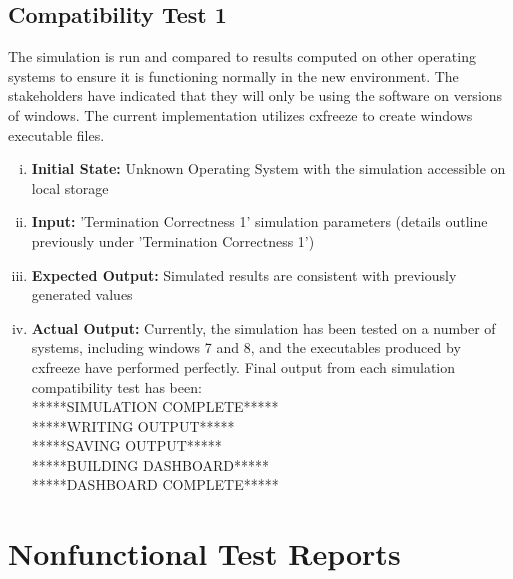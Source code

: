\documentclass[paper=letter, fontsize=10pt]{scrartcl}
\numberwithin{equation}{section}		%
\numberwithin{figure}{section}			%
\numberwithin{table}{section}				%
\begin{document}
\begin{enumerate}[(i)]
\subsection{Compatibility Test 1} %
The simulation is run and compared to results computed on other operating systems to ensure it is functioning normally in the new environment. The stakeholders have indicated that they will only be using the software on versions of windows. The current implementation utilizes cxfreeze to create windows executable files. 
\begin{enumerate}[(i)]
	\item \textbf{Initial State:} Unknown Operating System with the simulation accessible on local storage
	\item \textbf{Input:} 'Termination Correctness 1' simulation parameters (details outline previously under 'Termination Correctness 1')
	\item \textbf{Expected Output:} Simulated results are consistent with previously generated values
	\item \textbf{Actual Output:} Currently, the simulation has been tested on a number of systems, including windows 7 and 8, and the executables produced by cxfreeze have performed perfectly. Final output from each simulation compatibility test has been: \\
	*****SIMULATION COMPLETE*****\\
	*****WRITING OUTPUT*****\\
	*****SAVING OUTPUT*****\\
	*****BUILDING DASHBOARD*****\\
	*****DASHBOARD COMPLETE*****\\
\end{enumerate}

\section{Nonfunctional Test Reports}

\end{enumerate}
\end{document}

